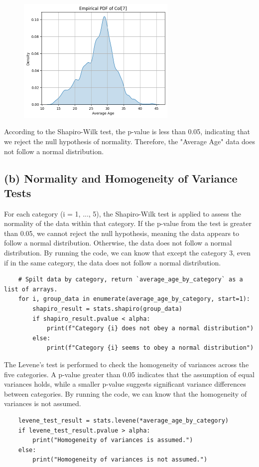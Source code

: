 \documentclass[12pt]{article}
\begin{document}
\begin{figure}[h]
    \centering
    \includegraphics[width=0.68\textwidth]{image/output1.png}  
    \label{fig:Output for Normality Test}
\end{figure}

According to the Shapiro-Wilk test, the p-value is less than 0.05, indicating that we reject the null hypothesis of normality. Therefore, the "Average Age" data does not follow a normal distribution.

\subsection*{(b) Normality and Homogeneity of Variance Tests}

For each category (i = 1, ..., 5), the Shapiro-Wilk test is applied to assess the normality of the data within that category. If the p-value from the test is greater than 0.05, we cannot reject the null hypothesis, meaning the data appears to follow a normal distribution. Otherwise, the data does not follow a normal distribution.
By running the code, we can know that except the category 3, even if in the same category, the data does not follow a normal distribution.

\begin{verbatim}
    # Spilt data by category, return `average_age_by_category` as a list of arrays.
    for i, group_data in enumerate(average_age_by_category, start=1):
        shapiro_result = stats.shapiro(group_data)
        if shapiro_result.pvalue < alpha:
            print(f"Category {i} does not obey a normal distribution")
        else:
            print(f"Category {i} seems to obey a normal distribution")
\end{verbatim}


The Levene's test is performed to check the homogeneity of variances across the five categories. A p-value greater than 0.05 indicates that the assumption of equal variances holds, while a smaller p-value suggests significant variance differences between categories.
By running the code, we can know that the homogeneity of variances is not assumed.
\begin{verbatim}
    levene_test_result = stats.levene(*average_age_by_category)
    if levene_test_result.pvalue > alpha:
        print("Homogeneity of variances is assumed.")
    else:
        print("Homogeneity of variances is not assumed.")
\end{verbatim}
\end{document}
